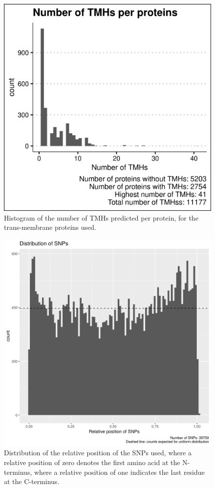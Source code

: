 \begin{figure}[!htbp]
  \includegraphics[width=\textwidth]{ncbi_peregrine_results/fig_n_tmhs_per_protein.png}
  \caption{
    Histogram of the number of TMHs predicted per protein,
    for the trans-membrane proteins used.
  }
  \label{fig:n_tmhs_per_protein}
\end{figure}

\begin{figure}[!htbp]
  \includegraphics[width=\textwidth]{ncbi_peregrine_results/fig_snp_rel_pos.png}
  \caption{
    Distribution of the relative position of the SNPs used,
    where a relative position of zero denotes the first amino
    acid at the N-terminus, where a relative position of one
    indicates the last residue at the C-terminus.
  }
  \label{fig:snp_rel_pos}
\end{figure}

